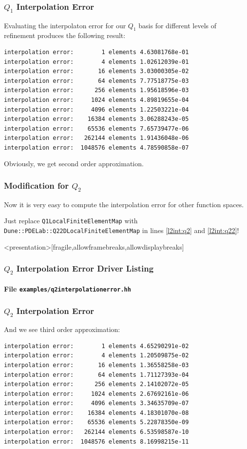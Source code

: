 \begin{frame}[fragile]
\frametitle<presentation>{$Q_1$ Interpolation Error}
Evaluating the interpolaton error for our $Q_1$ basis for different
levels of refinement produces the following result:
\begin{lstlisting}[basicstyle=\ttfamily\scriptsize]
interpolation error:        1 elements 4.63081768e-01
interpolation error:        4 elements 1.02612039e-01
interpolation error:       16 elements 3.03000305e-02
interpolation error:       64 elements 7.77518775e-03
interpolation error:      256 elements 1.95618596e-03
interpolation error:     1024 elements 4.89819655e-04
interpolation error:     4096 elements 1.22503221e-04
interpolation error:    16384 elements 3.06288243e-05
interpolation error:    65536 elements 7.65739477e-06
interpolation error:   262144 elements 1.91436048e-06
interpolation error:  1048576 elements 4.78590858e-07
\end{lstlisting}
Obviously, we get second order approximation.
\end{frame}

\begin{frame}
\frametitle<presentation>{Modification for $Q_2$}
Now it is very easy to compute the interpolation error for other
function spaces.

Just replace \lstinline{Q1LocalFiniteElementMap}
with \lstinline{Dune::PDELab::Q22DLocalFiniteElementMap} in
lines \ref{l2int:q2} and \ref{l2int:q22}!
\end{frame}

\begin{frame}<presentation>[fragile,allowframebreaks,allowdisplaybreaks]
\frametitle<presentation>{$Q_2$ Interpolation Error Driver Listing}
\framesubtitle<presentation>{File \texttt{examples/q2interpolationerror.hh}}

\end{frame}

\begin{frame}[fragile]
\frametitle<presentation>{$Q_2$ Interpolation Error}
And we see third order approximation:
\begin{lstlisting}[basicstyle=\ttfamily\scriptsize]
interpolation error:        1 elements 4.65290291e-02
interpolation error:        4 elements 1.20509875e-02
interpolation error:       16 elements 1.36558258e-03
interpolation error:       64 elements 1.71127393e-04
interpolation error:      256 elements 2.14102072e-05
interpolation error:     1024 elements 2.67692161e-06
interpolation error:     4096 elements 3.34635709e-07
interpolation error:    16384 elements 4.18301070e-08
interpolation error:    65536 elements 5.22878350e-09
interpolation error:   262144 elements 6.53598587e-10
interpolation error:  1048576 elements 8.16998215e-11
\end{lstlisting}
\end{frame}

